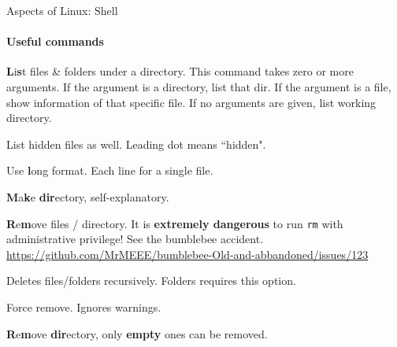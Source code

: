 \begin{frame}{Aspects of Linux: Shell}
\framesubtitle{Useful commands}
	\begin{description}[mkdir]
		\item[ls] \textbf{L}i\textbf{s}t files \& folders under a directory. This command takes zero or more arguments. If the argument is a directory, list that dir. If the argument is a file, show information of that specific file. If no arguments are given, list working directory.
		\begin{description}[-a]
			\small
			\item[-a] List hidden files as well. Leading dot means ``hidden".
			\item[-l] Use \textbf{l}ong format. Each line for a single file. 
		\end{description}
		\item[mkdir] \textbf{M}a\textbf{k}e \textbf{dir}ectory, self-explanatory.
		\item[rm] \textbf{R}e\textbf{m}ove files / directory. It is \textbf{extremely dangerous} to run \texttt{rm} with administrative privilege! See the bumblebee accident. \url{https://github.com/MrMEEE/bumblebee-Old-and-abbandoned/issues/123}
		\begin{description}[-a]
			\small
			\item[-r] Deletes files/folders recursively. Folders requires this option.
			\item[-f] Force remove. Ignores warnings.  
		\end{description}
		\item[rmdir] \textbf{R}e\textbf{m}ove \textbf{dir}ectory, only \textbf{empty} ones can be removed.
	\end{description}

\end{frame}


